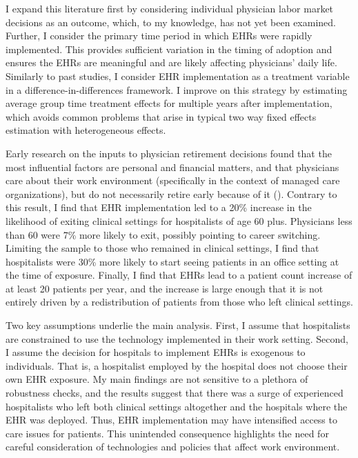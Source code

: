 \documentclass[12pt]{article}
\begin{document}
I expand this literature first by considering individual physician labor market decisions as an outcome, which, to my knowledge, has not yet been examined. Further, I consider the primary time period in which EHRs were rapidly implemented. This provides sufficient variation in the timing of adoption and ensures the EHRs are meaningful and are likely affecting physicians' daily life. Similarly to past studies, I consider EHR implementation as a treatment variable in a difference-in-differences framework. I improve on this strategy by estimating average group time treatment effects for multiple years after implementation, which avoids common problems that arise in typical two way fixed effects estimation with heterogeneous effects.  

Early research on the inputs to physician retirement decisions found that the most influential factors are personal and financial matters, and that physicians care about their work environment (specifically in the context of managed care organizations), but do not necessarily retire early because of it (\cite{Bahrami2002}). Contrary to this result, I find that EHR implementation led to a 20\% increase in the likelihood of exiting clinical settings for hospitalists of age 60 plus. Physicians less than 60 were 7\% more likely to exit, possibly pointing to career switching. Limiting the sample to those who remained in clinical settings, I find that hospitalists were 30\% more likely to start seeing patients in an office setting at the time of exposure. Finally, I find that EHRs lead to a patient count increase of at least 20 patients per year, and the increase is large enough that it is not entirely driven by a redistribution of patients from those who left clinical settings. 

Two key assumptions underlie the main analysis. First, I assume that hospitalists are constrained to use the technology implemented in their work setting. Second, I assume the decision for hospitals to implement EHRs is exogenous to individuals. That is, a hospitalist employed by the hospital does not choose their own EHR exposure. My main findings are not sensitive to a plethora of robustness checks, and the results suggest that there was a surge of experienced hospitalists who left both clinical settings altogether and the hospitals where the EHR was deployed. Thus, EHR implementation may have intensified access to care issues for patients. This unintended consequence highlights the need for careful consideration of technologies and policies that affect work environment.  
\end{document}
